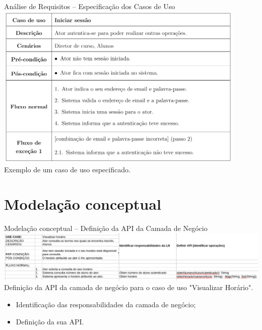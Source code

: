 \documentclass[13pt, handout]{beamer}
\begin{document}
\begin{frame}{Análise de Requisitos -- Especificação dos Casos de Uso}
    \centering
    \includegraphics[width=0.9\textwidth]{Imagens/Slides/UseCase.png} \\
    {\scriptsize Exemplo de um caso de uso especificado.}
\end{frame}

\section{Modelação conceptual}

\begin{frame}{\large Modelação conceptual -- Definição da API da Camada de Negócio}
    \centering
    \includegraphics[width=\textwidth]{Imagens/Slides/API.png} \\
    {\scriptsize Definição da API da camada de negócio para o caso de uso "Visualizar Horário"{}.}

    \vspace{0.5cm}
    \begin{itemize}
        \item Identificação das responsabilidades da camada de negócio;
        \item Definição da sua API.
    \end{itemize}
\end{frame}
\end{document}
